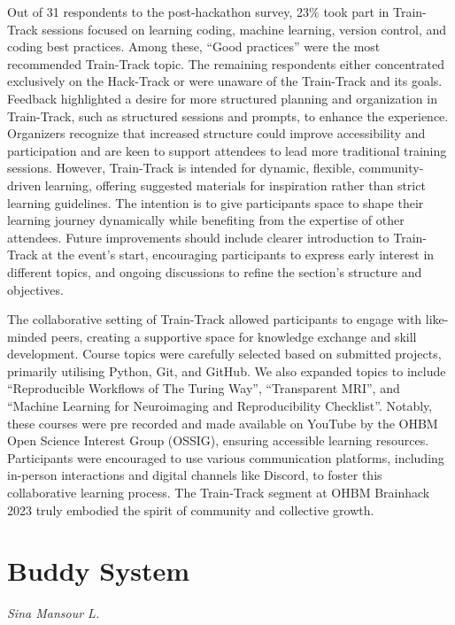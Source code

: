 \documentclass{article}
\newcommand\coordinator[1]{\begin{flushleft}\small\textit{#1}\end{flushleft}}
\begin{document}
Out of 31 respondents to the post-hackathon survey, 23\% took part in Train-Track sessions focused on learning coding, machine learning, version control, and coding best practices.
Among these, “Good practices” were the most recommended Train-Track topic.
The remaining respondents either concentrated exclusively on the Hack-Track or were unaware of the Train-Track and its goals.
Feedback highlighted a desire for more structured planning and organization in Train-Track, such as structured sessions and prompts, to enhance the experience.
Organizers recognize that increased structure could improve accessibility and participation and are keen to support attendees to lead more traditional training sessions.
However, Train-Track is intended for dynamic, flexible, community-driven learning, offering suggested materials for inspiration rather than strict learning guidelines.
The intention is to give participants space to shape their learning journey dynamically while benefiting from the expertise of other attendees.
Future improvements should include clearer introduction to Train-Track at the event's start, encouraging participants to express early interest in different topics, and ongoing discussions to refine the section’s structure and objectives.

The collaborative setting of Train-Track allowed participants to engage with like-minded peers, creating a supportive space for knowledge exchange and skill development.
Course topics were carefully selected based on submitted projects, primarily utilising Python, Git, and GitHub.
We also expanded topics to include “Reproducible Workflows of The Turing Way”, “Transparent MRI”, and “Machine Learning for Neuroimaging and Reproducibility Checklist”.
Notably, these courses were pre recorded and made available on YouTube by the OHBM Open Science Interest Group (OSSIG), ensuring accessible learning resources.
Participants were encouraged to use various communication platforms, including in-person interactions and digital channels like Discord, to foster this collaborative learning process.
The Train-Track segment at OHBM Brainhack 2023 truly embodied the spirit of community and collective growth.

\section{Buddy System}
\coordinator{Sina Mansour L.}
\end{document}

